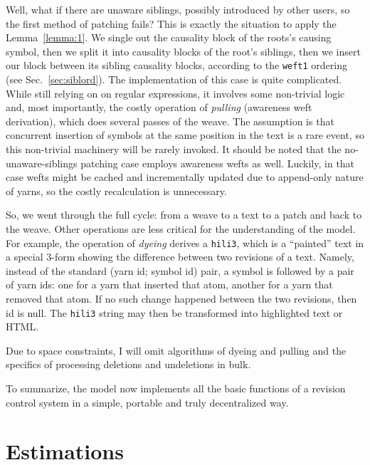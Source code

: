 \documentclass{acm_proc_article-sp}
\begin{document}
Well, what if there are unaware siblings, possibly introduced
by other users, so the first method of patching fails?
This is exactly the situation to apply the Lemma~\ref{lemma:1}. 
We single out the causality block of
the roots's causing symbol, then we split it into causality
blocks of the root's siblings, then we insert our block between
its sibling causality blocks,
according to the {\tt weft1} ordering (see Sec.~\ref{sec:siblord}).
The implementation of this case is quite complicated. While
still relying on on regular expressions, it involves some
non-trivial logic and, most importantly, the costly operation
of \emph{pulling} (awareness weft derivation), which does
several passes of the weave.
The assumption is that concurrent
insertion of symbols at the same position in the text is
a rare event, so this non-trivial machinery will be rarely
invoked.
It should be noted that the no-unaware-siblings patching case
employs awareness wefts as well. Luckily, in that case
wefts might be cached and incrementally updated
due to append-only nature of yarns, so the costly recalculation
is unnecessary.

So, we went through the full cycle: from a weave to a text
to a patch and back to the weave. Other operations are less
critical for the understanding of the model. For example, the
operation of \emph{dyeing} derives a {\tt hili3}, which is a
``painted'' text in a special 3-form showing the difference
between two revisions of a text. Namely, instead of the standard
(yarn id; symbol id) pair, a symbol is followed by a pair
of yarn ids: one for a yarn that inserted that atom,
another for a yarn that removed that atom. If no such
change happened between the two revisions, then id is null.
The {\tt hili3} string may then be transformed into
highlighted text or HTML.

Due to space constraints,
I will omit algorithms of dyeing and  pulling and the specifics
of processing deletions and undeletions in bulk.

To summarize, the model now implements all the basic
functions of a revision control system in a simple, 
portable and truly decentralized way.

\section{Estimations}
\end{document}
